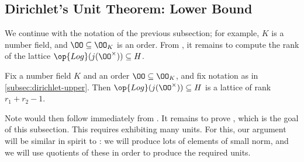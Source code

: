 \documentclass[../notes.tex]{subfiles}
\begin{document}
\subsection{Dirichlet's Unit Theorem: Lower Bound}
We continue with the notation of the previous subsection; for example, $K$ is a number field, and $\OO\subseteq\OO_K$ is an order. From , it remains to compute the rank of the lattice $\op{Log}(j(\OO^\times))\subseteq H$.
\begin{proposition} \label{prop:compute-unit-rank}
	Fix a number field $K$ and an order $\OO\subseteq\OO_K$, and fix notation as in \cref{subsec:dirichlet-upper}. Then $\op{Log}(j(\OO^\times))\subseteq H$ is a lattice of rank $r_1+r_2-1$.
\end{proposition}
Note  would then follow immediately from . It remains to prove , which is the goal of this subsection. This requires exhibiting many units. For this, our argument will be similar in spirit to : we will produce lots of elements of small norm, and we will use quotients of these in order to produce the required units.
\end{document}
